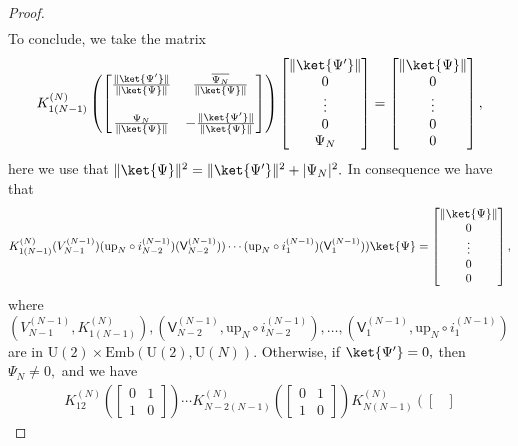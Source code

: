 \documentclass[a4paper,11pt]{article}
\newcommand{\rV}{\mathsf{V}}
\begin{document}
\begin{appendices}
\begin{proof}
\begin{align*}
    \end{align*}
    To conclude, we take the matrix 
    $$
  K_{1(N-1)}^{(N)}\left(
    \begin{bmatrix}
      \frac{\|\ket{\Psi^{\prime}}\|}{\|\ket{\Psi}\|} & \frac{\overline{\Psi_N}}{\|\ket{\Psi}\|} \\
      & \\
      \frac{\Psi_N}{\|\ket{\Psi}\|} & - \frac{\|\ket{\Psi^{\prime}}\|}{\|\ket{\Psi}\|}
    \end{bmatrix}
  \right)\begin{bmatrix} \|\ket{\Psi^{\prime}}\| \\ 0 \\ \vdots  \\ 0 \\ \Psi_N \end{bmatrix} = \begin{bmatrix} \|\ket{\Psi}\| \\ 0 \\ \vdots  \\ 0 \\ 0 \end{bmatrix},
    $$
  here we use that $\|\ket{\Psi}\|^2 =\|\ket{\Psi^{\prime}}\|^2 + |\Psi_N|^2.$ In consequence we have that 
  $$
  K_{1(N-1)}^{(N)}(V_{N-1}^{(N-1)})(\mathrm{up}_N \circ i_{N-2}^{(N-1)})(\rV_{N-2}^{(N-1)})) \cdots  (\mathrm{up}_N \circ i_1^{(N-1)})(\rV_1^{(N-1)})) \ket{\Psi} = \begin{bmatrix} \|\ket{\Psi}\| \\ 0 \\ \vdots  \\ 0 \\ 0 \end{bmatrix},
  $$
  where 
  $
  (V_{N-1}^{(N-1)},K_{1(N-1)}^{(N)}),(\rV_{N-2}^{(N-1)},\mathrm{up}_N \circ i_{N-2}^{(N-1)}),\ldots,(\rV_1^{(N-1)},\mathrm{up}_N \circ i_1^{(N-1)})$ are in  $\mathrm{U}(2) \times\mathrm{Emb}(\mathrm{U}(2),\mathrm{U}(N)) .$ Otherwise, if $\ket{\Psi^{\prime}} = 0,$ then $\Psi_N \neq 0,$ and we have
  \begin{align*}
    K_{12}^{(N)}\left( \begin{bmatrix}
      0 & 1 \\
     1 & 0 \end{bmatrix}
     \right) \cdots K_{N-2(N-1)}^{(N)}\left( \begin{bmatrix}
      0 & 1 \\
     1 & 0 \end{bmatrix}
     \right) K_{N(N-1)}^{(N)}\left( \begin{bmatrix}

\end{bmatrix}
\end{align*}
\end{proof}
\end{appendices}
\end{document}
